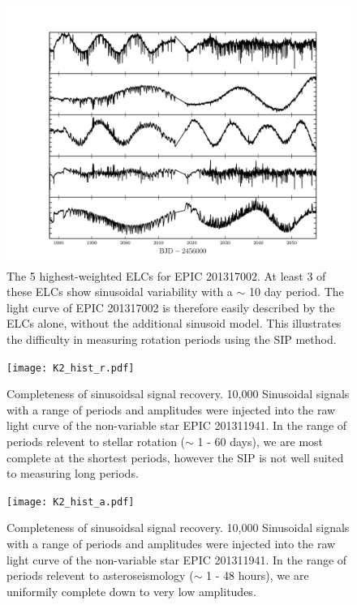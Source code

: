 \documentclass[useAMS, usenatbib]{aastex}
\begin{document}
\begin{figure}
\begin{center}
\includegraphics[width=6in, clip=true]{201317002_top5.pdf}
\caption{The 5 highest-weighted ELCs for EPIC 201317002. At least 3 of these
	ELCs show sinusoidal variability with a $\sim$ 10 day period.
	The light curve of EPIC 201317002 is therefore easily described by the
	ELCs alone, without the additional sinusoid model.
	This illustrates the difficulty in measuring rotation periods using the
	SIP method.}
\label{fig:top5}
\end{center}
\end{figure}

\begin{figure}
\begin{center}
\texttt{[image: K2\_hist\_r.pdf]}
\caption{Completeness of sinusoidsal signal recovery. 10,000 Sinusoidal signals
with a range of periods and amplitudes were injected into the raw light curve
of the non-variable star EPIC 201311941. In the range of periods relevent to
stellar rotation ($\sim$ 1 - 60 days), we are most complete at the shortest
periods, however the SIP is not well suited to measuring long periods.}
\label{fig:K2_hist_r}
\end{center}
\end{figure}

\begin{figure}
\begin{center}
\texttt{[image: K2\_hist\_a.pdf]}
\caption{Completeness of sinusoidsal signal recovery. 10,000 Sinusoidal signals
with a range of periods and amplitudes were injected into the raw light curve
of the non-variable star EPIC 201311941. In the range of periods relevent to
asteroseismology ($\sim$ 1 - 48 hours), we are uniformily complete down to
very low amplitudes.}
\label{fig:K2_hist_a}
\end{center}
\end{figure}
\end{document}
